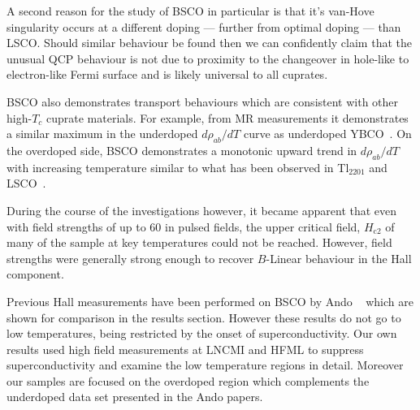 A second reason for the study of \ac{BSCO} in particular is that it's van-Hove singularity occurs at a different doping --- further from optimal doping --- than \ac{LSCO}. Should similar behaviour be found then we can confidently claim that the unusual \ac{QCP} behaviour is not due to proximity to the changeover in hole-like to electron-like Fermi surface and is likely universal to all cuprates. 

\ac{BSCO} also demonstrates transport behaviours which are consistent with other high-$T_c$ cuprate materials. For example, from \ac{MR} measurements it demonstrates a similar maximum in the underdoped $d\rho_{ab}/dT$ curve as underdoped YBCO~\cite{Ando1999}. On the overdoped side, \ac{BSCO} demonstrates a monotonic upward trend in $d\rho_{ab}/dT$ with increasing temperature similar to what has been observed in Tl$_{2201}$ and \ac{LSCO}~\cite{Ando1999}.

During the course of the investigations however, it became apparent that even with field strengths of up to \unit{60}{\tesla} in pulsed fields, the upper critical field, $H_{\textrm{c2}}$ of many of the sample at key temperatures could not be reached. However, field strengths were generally strong enough to recover $B$-Linear behaviour in the Hall component.

Previous Hall measurements have been performed on \ac{BSCO} by Ando \etal~\cite{Ando1999, Ando2000} which are shown for comparison in the results section. However these results do not go to low temperatures, being restricted by the onset of superconductivity. Our own results used high field measurements at \ac{LNCMI} and \ac{HFML} to suppress superconductivity and examine the low temperature regions in detail. Moreover our samples are focused on the overdoped region which complements the underdoped data set presented in the Ando papers.




